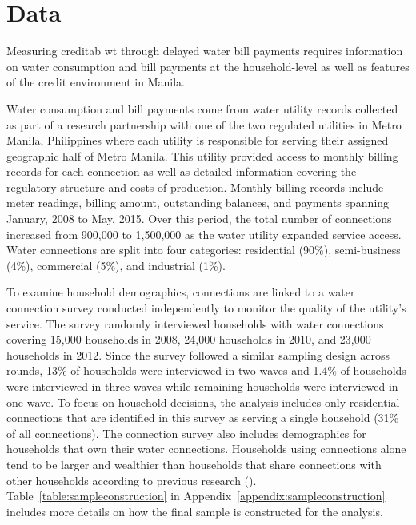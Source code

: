 \documentclass[12pt]{article}
\begin{document}
\section{Data}\label{section:data}


Measuring creditab wt through delayed water bill payments requires information on water consumption and bill payments at the household-level as well as features of the credit environment in Manila.  %

Water consumption and bill payments come from water utility records collected as part of a research partnership with one of the two regulated utilities in Metro Manila, Philippines where each utility is responsible for serving their assigned geographic half of Metro Manila.  This utility provided access to monthly billing records for each connection as well as detailed information covering the regulatory structure and costs of production.  Monthly billing records include meter readings, billing amount, outstanding balances, and payments spanning January, 2008 to May, 2015.  Over this period, the total number of connections increased from 900,000 to 1,500,000 as the water utility expanded service access.  Water connections are split into four categories: residential (90\%), semi-business (4\%), commercial (5\%), and industrial (1\%).  

To examine household demographics, connections are linked to a water connection survey conducted independently to monitor the quality of the utility's service.  The survey randomly interviewed households with water connections covering 15,000 households in 2008, 24,000 households in 2010, and 23,000 households in 2012.  Since the survey followed a similar sampling design across rounds, 13\% of households were interviewed in two waves and 1.4\% of households were interviewed in three waves while remaining households were interviewed in one wave.  To focus on household decisions, the analysis includes only residential connections that are identified in this survey as serving a single household (31\% of all connections).  The connection survey also includes demographics for households that own their water connections.  Households using connections alone tend to be larger and wealthier than households that share connections with other households according to previous research (\cite{wjv}).  Table~\ref{table:sampleconstruction} in Appendix~\ref{appendix:sampleconstruction} includes more details on how the final sample is constructed for the analysis.
\end{document}

